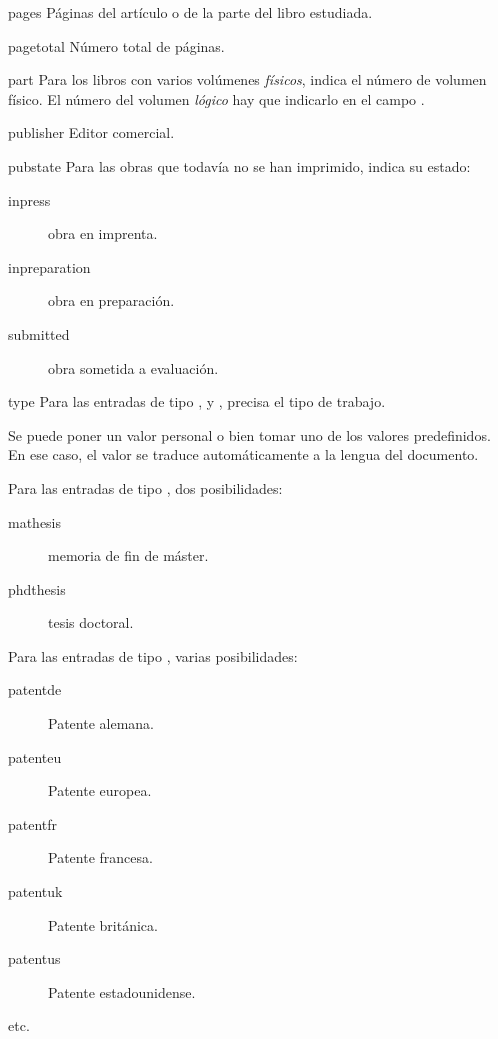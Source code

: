 \begin{choix}
	\item[pages] Páginas del artículo o de la parte del libro estudiada. 
	\item[pagetotal] Número total de páginas.
   	\item[part] Para los libros con varios volúmenes
          \emph{físicos}, indica el número de volumen físico. El
          número del volumen  \emph{lógico} hay que indicarlo en el campo .
   	\item[publisher] Editor comercial.					
   	\item[pubstate] Para las obras que todavía no se han
          imprimido, indica su estado:
					\begin{description}
						\item[inpress]obra en imprenta.
						\item[inpreparation]obra en preparación.
						\item[submitted]obra sometida a evaluación.
					\end{description}
					
					
   	\item[type] Para las entradas de tipo  ,
           y , precisa el tipo de trabajo.
	
	Se puede poner un valor personal o bien tomar uno de los
        valores predefinidos. En ese caso, el valor se traduce
        automáticamente a la lengua del documento.
	
	 Para las entradas de tipo , dos posibilidades:
					\begin{description}
						\item[mathesis]memoria
                                                  de fin de máster.
						\item[phdthesis]tesis doctoral.
					\end{description}
					
					Para las entradas de tipo
                                        , varias posibilidades: 
					 
					 
					 \begin{description}
						\item[patentde]
                                                  Patente alemana.
						\item[patenteu]
                                                  Patente europea.
						\item[patentfr]
                                                  Patente francesa.
						\item[patentuk]
                                                  Patente británica.
						\item[patentus]
                                                  Patente estadounidense.
						\item[etc.]
					 \end{description}
					

\end{choix}
